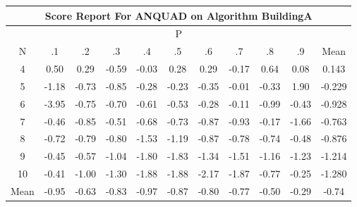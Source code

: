 \documentclass[11pt,a4paper]{report}
\begin{document}
\begin{longtable}{ | c || c | c | c | c | c | c | c | c | c || c |}
\hline
\multicolumn{11}{|c|}{ Score Report For ANQUAD on Algorithm BuildingA} \\
\hline
\multicolumn{11}{|c|}{ P } \\
\hline
N & .1 & .2 & .3 & .4 & .5 & .6 & .7 & .8 & .9 & Mean\\
 \hline
 \hline
 \endhead
  4 &  \cellcolor[HTML]{EFEFFF} 0.50 &  \cellcolor[HTML]{F7F7FF} 0.29 &  \cellcolor[HTML]{FFEFEF} -0.59 &  \cellcolor[HTML]{FFFFFF} -0.03 &  \cellcolor[HTML]{F7F7FF} 0.28 &  \cellcolor[HTML]{F7F7FF} 0.29 &  \cellcolor[HTML]{FFF7F7} -0.17 &  \cellcolor[HTML]{EFEFFF} 0.64 &  \cellcolor[HTML]{FFFFFF} 0.08 & 0.143 \\
  5 &  \cellcolor[HTML]{FFDFDF} -1.18 &  \cellcolor[HTML]{FFEFEF} -0.73 &  \cellcolor[HTML]{FFE7E7} -0.85 &  \cellcolor[HTML]{FFF7F7} -0.28 &  \cellcolor[HTML]{FFF7F7} -0.23 &  \cellcolor[HTML]{FFF7F7} -0.35 &  \cellcolor[HTML]{FFFFFF} -0.01 &  \cellcolor[HTML]{FFF7F7} -0.33 &  \cellcolor[HTML]{CFCFFF} 1.90 & -0.229 \\
  6 &  \cellcolor[HTML]{FF9F9F} -3.95 &  \cellcolor[HTML]{FFEFEF} -0.75 &  \cellcolor[HTML]{FFEFEF} -0.70 &  \cellcolor[HTML]{FFEFEF} -0.61 &  \cellcolor[HTML]{FFEFEF} -0.53 &  \cellcolor[HTML]{FFF7F7} -0.28 &  \cellcolor[HTML]{FFFFFF} -0.11 &  \cellcolor[HTML]{FFE7E7} -0.99 &  \cellcolor[HTML]{FFF7F7} -0.43 & -0.928 \\
  7 &  \cellcolor[HTML]{FFF7F7} -0.46 &  \cellcolor[HTML]{FFE7E7} -0.85 &  \cellcolor[HTML]{FFEFEF} -0.51 &  \cellcolor[HTML]{FFEFEF} -0.68 &  \cellcolor[HTML]{FFEFEF} -0.73 &  \cellcolor[HTML]{FFE7E7} -0.87 &  \cellcolor[HTML]{FFE7E7} -0.93 &  \cellcolor[HTML]{FFF7F7} -0.17 &  \cellcolor[HTML]{FFD7D7} -1.66 & -0.763 \\
  8 &  \cellcolor[HTML]{FFEFEF} -0.72 &  \cellcolor[HTML]{FFEFEF} -0.79 &  \cellcolor[HTML]{FFE7E7} -0.80 &  \cellcolor[HTML]{FFD7D7} -1.53 &  \cellcolor[HTML]{FFDFDF} -1.19 &  \cellcolor[HTML]{FFE7E7} -0.87 &  \cellcolor[HTML]{FFEFEF} -0.78 &  \cellcolor[HTML]{FFEFEF} -0.74 &  \cellcolor[HTML]{FFF7F7} -0.48 & -0.876 \\
  9 &  \cellcolor[HTML]{FFF7F7} -0.45 &  \cellcolor[HTML]{FFEFEF} -0.57 &  \cellcolor[HTML]{FFE7E7} -1.04 &  \cellcolor[HTML]{FFCFCF} -1.80 &  \cellcolor[HTML]{FFCFCF} -1.83 &  \cellcolor[HTML]{FFDFDF} -1.34 &  \cellcolor[HTML]{FFD7D7} -1.51 &  \cellcolor[HTML]{FFDFDF} -1.16 &  \cellcolor[HTML]{FFDFDF} -1.23 & -1.214 \\
  10 &  \cellcolor[HTML]{FFF7F7} -0.41 &  \cellcolor[HTML]{FFE7E7} -1.00 &  \cellcolor[HTML]{FFDFDF} -1.30 &  \cellcolor[HTML]{FFCFCF} -1.88 &  \cellcolor[HTML]{FFCFCF} -1.88 &  \cellcolor[HTML]{FFC7C7} -2.17 &  \cellcolor[HTML]{FFCFCF} -1.87 &  \cellcolor[HTML]{FFEFEF} -0.77 &  \cellcolor[HTML]{FFF7F7} -0.25 & -1.280 \\
 \hline
 \hline
Mean &  \cellcolor[HTML]{FFE7E7} -0.95 &  \cellcolor[HTML]{FFEFEF} -0.63 &  \cellcolor[HTML]{FFE7E7} -0.83 &  \cellcolor[HTML]{FFE7E7} -0.97 &  \cellcolor[HTML]{FFE7E7} -0.87 &  \cellcolor[HTML]{FFE7E7} -0.80 &  \cellcolor[HTML]{FFEFEF} -0.77 &  \cellcolor[HTML]{FFEFEF} -0.50 &  \cellcolor[HTML]{FFF7F7} -0.29 &  \cellcolor[HTML]{FFEFEF} -0.74
\end{longtable}
\end{document}

